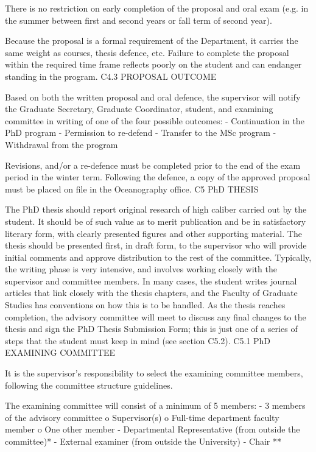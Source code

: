 There is no restriction on early completion of the proposal and oral exam (e.g. in the summer between first and second years or fall term of second year).

Because the proposal is a formal requirement of the Department, it carries the same weight as courses, thesis defence, etc. Failure to complete the proposal within the required time frame reflects poorly on the student and can endanger standing in the program.
C4.3	PROPOSAL OUTCOME

Based on both the written proposal and oral defence, the supervisor will notify the Graduate Secretary, Graduate Coordinator, student, and examining committee in writing of one of the four possible outcomes:
-	Continuation in the PhD program
-	Permission to re-defend
-	Transfer to the MSc program
-	Withdrawal from the program

Revisions, and/or a re-defence must be completed prior to the end of the exam period in the winter term. Following the defence, a copy of the approved proposal must be placed on file in the Oceanography office.
C5	PhD THESIS

The PhD thesis should report original research of high caliber carried out by the student. It should be of such value as to merit publication and be in satisfactory literary form, with clearly presented figures and other supporting material. The thesis should be presented first, in draft form, to the supervisor who will provide initial comments and approve distribution to the rest of the committee. Typically, the writing phase is very intensive, and involves working closely with the supervisor and committee members. In many cases, the student writes journal articles that link closely with the thesis chapters, and the Faculty of Graduate Studies has conventions on how this is to be handled. As the thesis reaches completion, the advisory committee will meet to discuss any final changes to the thesis and sign the PhD Thesis Submission Form; this is just one of a series of steps that the student must keep in mind (see section C5.2).
C5.1	PhD EXAMINING COMMITTEE
 

It is the supervisor’s responsibility to select the examining committee members, following the committee structure guidelines.

The examining committee will consist of a minimum of 5 members:
-	3 members of the advisory committee
o	Supervisor(s)
o	Full-time department faculty member
o	One other member
-	Departmental Representative (from outside the committee)*
-	External examiner (from outside the University)
-	Chair **

